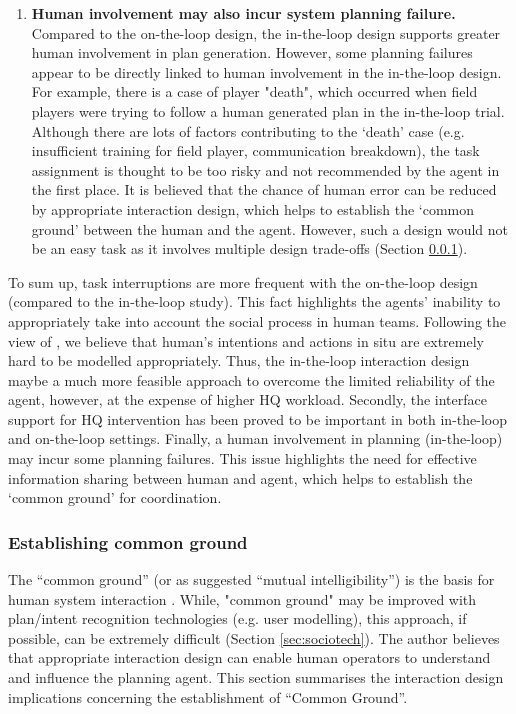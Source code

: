 \begin{enumerate}
\item \textbf{Human involvement may also incur system planning failure.} \\
Compared to the on-the-loop design, the in-the-loop design supports greater human involvement in plan generation. However, some planning failures appear to be directly linked to human involvement in the in-the-loop design. For example, there is a case of  player "death", which occurred  when field players were trying to follow a human generated plan in the in-the-loop trial.  Although there are lots of factors contributing to the `death' case (e.g. insufficient training for field player, communication breakdown), the task assignment is thought to be too risky and not recommended by the agent in the first place. It is believed that the chance of human error can be reduced by appropriate interaction design, which helps to establish the `common ground' between the human and the agent. However, such a design would not be an easy task as it involves multiple design trade-offs  (Section \ref{sec:conclusionCG}).
\end{enumerate}

To sum up, task interruptions are more frequent with the on-the-loop design (compared to the in-the-loop study). This fact highlights the agents' inability to appropriately take into account the social process in human teams. Following the view of \cite{Suchman1987}, we believe that human's intentions and actions in situ are extremely hard to be modelled appropriately. Thus, the in-the-loop interaction design maybe  a much more feasible approach to overcome the limited reliability of the agent, however, at the expense of higher HQ workload. Secondly, the interface support for HQ intervention has been proved to be important in both in-the-loop and on-the-loop settings. Finally, a human involvement in planning (in-the-loop) may incur some planning failures. This issue highlights the need for effective information sharing between human and agent, which helps to establish the `common ground' for coordination. \\


\subsubsection{Establishing common ground} \label{sec:conclusionCG}
The ``common ground'' (or as \cite{Suchman1987} suggested ``mutual intelligibility'') is the basis for human system interaction \citep{Bradshaw2011}.  While, "common ground" may be improved with plan/intent recognition technologies (e.g. user modelling), this approach, if possible, can be extremely difficult (Section \ref{sec:sociotech}). The author believes that appropriate interaction design can enable human operators to understand and influence the planning agent. This section summarises the interaction design implications concerning the establishment of  ``Common Ground''.\\


